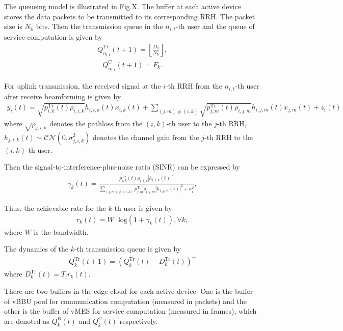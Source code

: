 \documentclass[12pt, draftclsnofoot, onecolumn]{IEEEtran}
\begin{document}
The queueing model is illustrated in Fig.X. The buffer at each active device stores the data packets to be transmitted to its corresponding RRH. The packet size is ${N_\mathrm{b}}$ bits. Then the transmission queue in the $n_{i,t}$-th user and the queue of service computation is given by
\begin{align}
	Q_{n_{i,t}}^{\mathrm{Tr}}(t+1)=\left\lfloor\frac{D_{k}}{N_\mathrm{b}}\right\rfloor,
\end{align}
\begin{align}
	Q_{n_{i,t}}^{\mathrm{C}}(t+1)=F_{k}.
\end{align}

For uplink transmission, the received signal at the $i$-th RRH from the $n_{i,t}$-th user after receive beamforming is given by
\begin{align}
	y_{i}(t) = \sqrt{p_{i,k}^{\mathrm{Tr}}(t)\rho_{i,i,k}}h_{i,i,k}(t)x_{i,k}(t)+\sum_{(j,m)\neq (i,k)}\sqrt{p_{j,m}^{\mathrm{Tr}}(t)\rho_{i,j,m}}h_{i,j,m}(t)x_{j,m}(t)+z_{i}(t)
\end{align}
where $\sqrt{\rho_{j,i,k}}$ denotes the pathloss from the $(i,k)$-th user to the $j$-th RRH, $h_{j,i,k}(t)\sim \mathcal{CN}(0,\sigma_{j,i,k}^{2})$ denotes the channel gain from the $j$-th RRH to the $(i,k)$-th user.

Then the signal-to-interference-plus-noise ratio (SINR) can be expressed by
\begin{align}
	\gamma_{k}(t)=\frac{p_{i,k}^{\mathrm{Tr}}(t)\rho_{i,i,k}|h_{i,i,k}(t)|^2}{\sum_{(j,m)\neq (i,k)}p_{j,m}^{\mathrm{Tr}}\rho_{i,j,m}|h_{i,j,m}(t)|^{2}+\sigma_{i}^{2}},
\end{align}

Thus, the achievable rate for the $k$-th user is given by
\begin{align}
	r_{k}(t)= W\cdot \text{log}(1+\gamma_{k}(t)), \forall k,
\end{align}
where $W$ is the bandwidth.

The dynamics of the $k$-th transmission queue is given by
\begin{align}
	Q_{k}^{\mathrm{Tr}}(t+1)=(Q_{k}^{\mathrm{Tr}}(t)-D_{k}^{\mathrm{Tr}}(t))^{+}
\end{align}
where $D_{k}^{\mathrm{Tr}}(t)=T_{\mathrm{f}}r_{k}(t)$.

There are two buffers in the edge cloud for each active device. One is the buffer of vBBU pool for communication computation (measured in packets) and the other is the buffer of vMES for service computation (measured in frames), which are denoted as $Q_{k}^{\mathrm{B}}(t)$ and $Q_{k}^{\mathrm{C}}(t)$ respectively.
\end{document}
